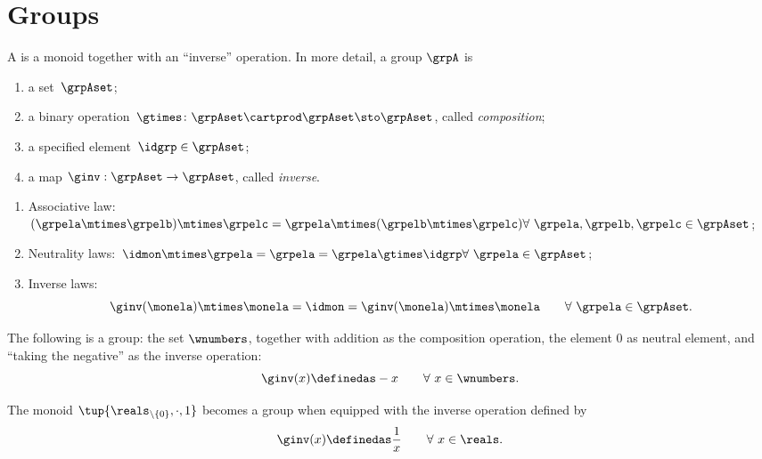 \section{Groups}
\label{sec:groups}
\begin{ctdefinition}[Group]
  \label{def:group}
  A \emph{} is a monoid together with an ``inverse'' operation.
  In more detail, a group $\grpA$ is
  \begin{body}
    \constit
    \begin{enumerate}
      \item a set~$\grpAset$;
      \item a binary operation~$\gtimes \colon \grpAset \cartprod \grpAset \sto \grpAset$, called \emph{composition};
      \item a specified element~$\idgrp \in \grpAset$;
      \item a map $\ginv: \grpAset \to \grpAset$, called \emph{inverse}.
    \end{enumerate}
    \condit
    \begin{enumerate}
      \item Associative law:~$(\grpela\mtimes \grpelb)\mtimes \grpelc=\grpela\mtimes (\grpelb\mtimes \grpelc) \hfill \forall \  \grpela, \grpelb, \grpelc \in \grpAset$;
      \item Neutrality laws:~$\idmon\mtimes \grpela=\grpela=\grpela \gtimes \idgrp \hfill \forall \  \grpela \in \grpAset$;
      \item Inverse laws:
      \begin{equation}
        \label{eq:group-inverse-law}
        \ginv(\monela) \mtimes \monela = \idmon = \ginv(\monela) \mtimes \monela \quad \quad \forall \  \grpela  \in \grpAset.
      \end{equation}
    \end{enumerate}
  \end{body}
\end{ctdefinition}
\begin{example}
  The following is a group: the set $\wnumbers$, together with addition as the composition operation, the element $0$ as neutral element, and ``taking the negative'' as the inverse operation:
  \begin{equation}
    \ginv(x) \definedas -x \quad \quad \forall \ x \in \wnumbers.
  \end{equation}
\end{example}
\begin{example}
  The monoid $\tup{\reals_{\backslash \{ 0 \}}, \cdot, 1}$ becomes a group when equipped with the inverse operation defined by
  \begin{equation}
    \ginv(x) \definedas \frac{1}{x} \quad \quad \forall \ x \in \reals.
  \end{equation}
\end{example}

